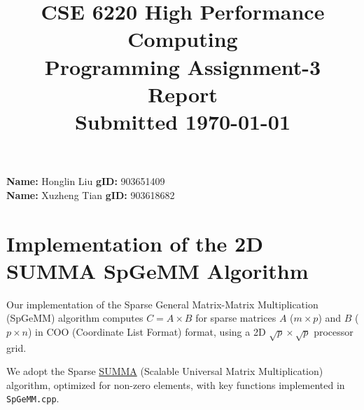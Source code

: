 \documentclass[11pt]{article}
\begin{document}
\title{\large\bf \vspace*{-0.3in}CSE 6220 High Performance Computing\\
Programming Assignment-3 Report \\Submitted \today}
\author{}
\date{}
\maketitle
\vspace*{-0.8in}
{\bf Name:} Honglin Liu \hfill{{\bf gID:} 903651409}\\
{\bf Name:} Xuzheng Tian \hfill{{\bf gID:} 903618682}\\

\section{Implementation of the 2D SUMMA SpGeMM Algorithm}

Our implementation of the Sparse General Matrix-Matrix Multiplication (SpGeMM) algorithm computes $C = A \times B$ for sparse matrices $A$ ($m \times p$) and $B$ ($p \times n$) in COO (Coordinate List Format) format, using a 2D $\sqrt{p} \times \sqrt{p}$ processor grid. 

We adopt the Sparse \href{https://www.netlib.org/lapack/lawnspdf/lawn96.pdf}{SUMMA} (Scalable Universal Matrix Multiplication) algorithm, optimized for non-zero elements, with key functions implemented in \texttt{SpGeMM.cpp}.
\end{document}
